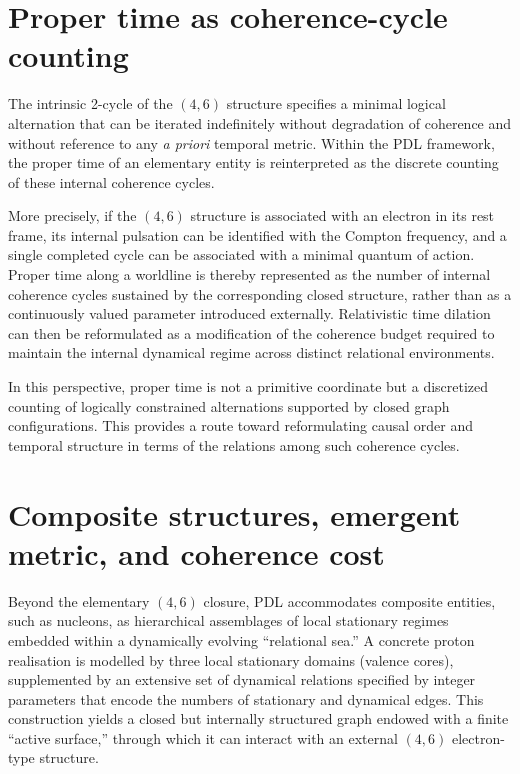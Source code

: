 \documentclass[11pt,a4paper]{article}
\begin{document}
\section{Proper time as coherence-cycle counting}

The intrinsic 2-cycle of the $(4,6)$ structure specifies a minimal logical alternation that can be iterated indefinitely without degradation of coherence and without reference to any \emph{a priori} temporal metric. Within the PDL framework, the proper time of an elementary entity is reinterpreted as the discrete counting of these internal coherence cycles.

More precisely, if the $(4,6)$ structure is associated with an electron in its rest frame, its internal pulsation can be identified with the Compton frequency, and a single completed cycle can be associated with a minimal quantum of action. Proper time along a worldline is thereby represented as the number of internal coherence cycles sustained by the corresponding closed structure, rather than as a continuously valued parameter introduced externally. Relativistic time dilation can then be reformulated as a modification of the coherence budget required to maintain the internal dynamical regime across distinct relational environments.

In this perspective, proper time is not a primitive coordinate but a discretized counting of logically constrained alternations supported by closed graph configurations. This provides a route toward reformulating causal order and temporal structure in terms of the relations among such coherence cycles.

\section{Composite structures, emergent metric, and coherence cost}

Beyond the elementary $(4,6)$ closure, PDL accommodates composite entities, such as nucleons, as hierarchical assemblages of local stationary regimes embedded within a dynamically evolving “relational sea.” A concrete proton realisation is modelled by three local stationary domains (valence cores), supplemented by an extensive set of dynamical relations specified by integer parameters that encode the numbers of stationary and dynamical edges. This construction yields a closed but internally structured graph endowed with a finite “active surface,” through which it can interact with an external $(4,6)$ electron-type structure.
\end{document}
